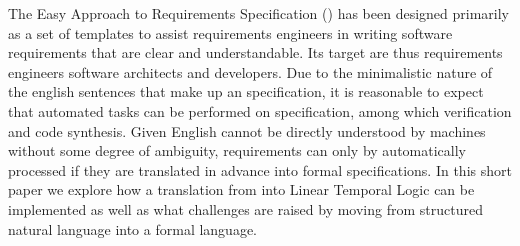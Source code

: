 The Easy Approach to Requirements Specification (\ears)
\cite{earsctrlProcess}\cite{LucioRCA16}\cite{LucioRAM17} has been designed primarily as a set of templates to assist requirements engineers
in writing software requirements that are clear and understandable.
Its target are thus requirements engineers software architects and developers.
Due to the minimalistic nature of the english sentences that make up an \ears
specification, it is reasonable to expect that automated tasks can be performed
on \ears specification, among which verification and code synthesis. Given
English cannot be directly understood by machines without some degree of
ambiguity, \ears requirements can only by automatically processed if they are
translated in advance into formal specifications. In this short paper we explore
how a translation from \ears into Linear Temporal Logic can be implemented as
well as what challenges are raised by moving from structured natural language
into a formal language.